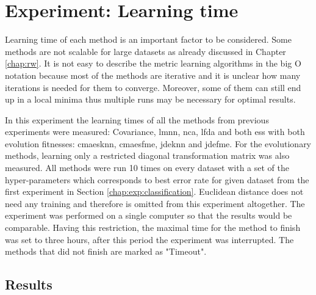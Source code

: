 \documentclass[12pt,a4paper]{report}
\begin{document}
\section{Experiment: Learning time} \label{chap:exp:learning-times}

Learning time of each method is an important factor to be considered. Some methods are not scalable for large datasets as already discussed in Chapter \ref{chap:rw}. It is not easy to describe the metric learning algorithms in the big O notation because most of the methods are iterative and it is unclear how many iterations is needed for them to converge. Moreover, some of them can still end up in a local minima thus multiple runs may be necessary for optimal results.

In this experiment the learning times of all the methods from previous experiments were measured: Covariance, \ac{lmnn}, \ac{nca}, \ac{lfda} and both \acp{es} with both evolution fitnesses: \ac{cmaesknn}, \ac{cmaesfme}, \ac{jdeknn} and \ac{jdefme}. For the evolutionary methods, learning only a restricted diagonal transformation matrix was also measured. All methods were run 10 times on every dataset with a set of the hyper-parameters which corresponds to best error rate for given dataset from the first experiment in Section \ref{chap:exp:classification}. Euclidean distance does not need any training and therefore is omitted from this experiment altogether. The experiment was performed on a single computer so that the results would be comparable. Having this restriction, the maximal time for the method to finish was set to three hours, after this period the experiment was interrupted. The methods that did not finish are marked as "Timeout".

\subsection{Results}
\end{document}
